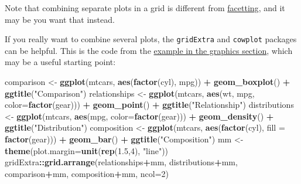 \documentclass[]{article}
\newenvironment{Shaded}{\begin{snugshade}}{\end{snugshade}}
\newcommand{\KeywordTok}[1]{\textcolor[rgb]{0.13,0.29,0.53}{\textbf{#1}}}
\newcommand{\DataTypeTok}[1]{\textcolor[rgb]{0.13,0.29,0.53}{#1}}
\newcommand{\DecValTok}[1]{\textcolor[rgb]{0.00,0.00,0.81}{#1}}
\newcommand{\FloatTok}[1]{\textcolor[rgb]{0.00,0.00,0.81}{#1}}
\newcommand{\StringTok}[1]{\textcolor[rgb]{0.31,0.60,0.02}{#1}}
\newcommand{\OperatorTok}[1]{\textcolor[rgb]{0.81,0.36,0.00}{\textbf{#1}}}
\newcommand{\NormalTok}[1]{#1}
\theoremstyle{definition}
\theoremstyle{definition}
\theoremstyle{definition}
\theoremstyle{remark}
\begin{document}
Note that combining separate plots in a grid is different from
\protect\hyperlink{facetting-plots}{facetting}, and it may be you want
that instead.

If you really want to combine several plots, the \texttt{gridExtra} and
\texttt{cowplot} packages can be helpful. This is the code from the
\protect\hyperlink{layered-graphics}{example in the graphics section},
which may be a useful starting point:

\begin{Shaded}
\begin{Highlighting}[]
\NormalTok{comparison <-}\StringTok{ }\KeywordTok{ggplot}\NormalTok{(mtcars, }\KeywordTok{aes}\NormalTok{(}\KeywordTok{factor}\NormalTok{(cyl), mpg)) }\OperatorTok{+}\StringTok{ }\KeywordTok{geom_boxplot}\NormalTok{() }\OperatorTok{+}\StringTok{  }\KeywordTok{ggtitle}\NormalTok{(}\StringTok{"Comparison"}\NormalTok{)}
\NormalTok{relationships <-}\StringTok{ }\KeywordTok{ggplot}\NormalTok{(mtcars, }\KeywordTok{aes}\NormalTok{(wt, mpg, }\DataTypeTok{color=}\KeywordTok{factor}\NormalTok{(gear))) }\OperatorTok{+}\StringTok{ }\KeywordTok{geom_point}\NormalTok{() }\OperatorTok{+}\StringTok{ }\KeywordTok{ggtitle}\NormalTok{(}\StringTok{"Relationship"}\NormalTok{)}
\NormalTok{distributions <-}\StringTok{ }\KeywordTok{ggplot}\NormalTok{(mtcars, }\KeywordTok{aes}\NormalTok{(mpg, }\DataTypeTok{color=}\KeywordTok{factor}\NormalTok{(gear))) }\OperatorTok{+}\StringTok{ }\KeywordTok{geom_density}\NormalTok{() }\OperatorTok{+}\StringTok{ }\KeywordTok{ggtitle}\NormalTok{(}\StringTok{"Distribution"}\NormalTok{)}
\NormalTok{composition <-}\StringTok{ }\KeywordTok{ggplot}\NormalTok{(mtcars, }\KeywordTok{aes}\NormalTok{(}\KeywordTok{factor}\NormalTok{(cyl), }\DataTypeTok{fill =} \KeywordTok{factor}\NormalTok{(gear))) }\OperatorTok{+}\StringTok{ }\KeywordTok{geom_bar}\NormalTok{() }\OperatorTok{+}\StringTok{ }\KeywordTok{ggtitle}\NormalTok{(}\StringTok{"Composition"}\NormalTok{)}
\NormalTok{mm <-}\StringTok{ }\KeywordTok{theme}\NormalTok{(}\DataTypeTok{plot.margin=}\KeywordTok{unit}\NormalTok{(}\KeywordTok{rep}\NormalTok{(}\FloatTok{1.5}\NormalTok{,}\DecValTok{4}\NormalTok{), }\StringTok{"line"}\NormalTok{))}
\NormalTok{gridExtra}\OperatorTok{::}\KeywordTok{grid.arrange}\NormalTok{(relationships}\OperatorTok{+}\NormalTok{mm, distributions}\OperatorTok{+}\NormalTok{mm, comparison}\OperatorTok{+}\NormalTok{mm, composition}\OperatorTok{+}\NormalTok{mm, }\DataTypeTok{ncol=}\DecValTok{2}\NormalTok{)}
\end{Highlighting}
\end{Shaded}
\end{document}
